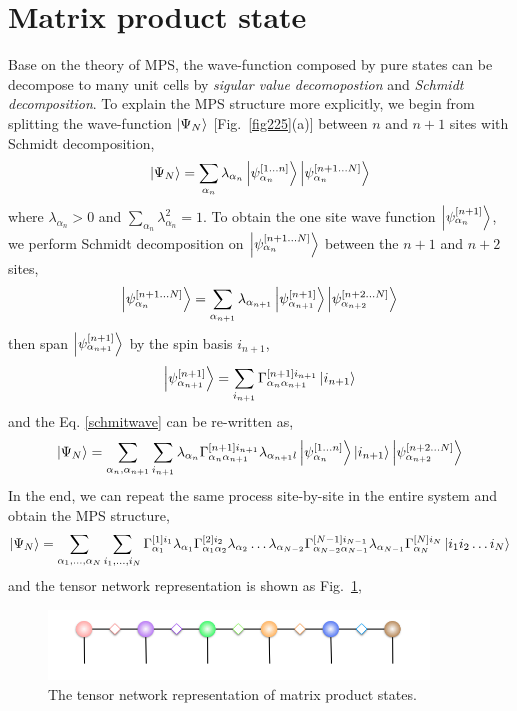 \section{Matrix product state}
\label{MPS}

Base on the theory of MPS, the wave-function composed by pure states can be decompose to many unit cells by \textit{sigular value decomopostion} and \textit{Schmidt decomposition}. To explain the MPS structure more explicitly, we begin from splitting the wave-function $\Ket{\Psi_N}$ [Fig.~\ref{fig225}(a)] between $n$ and $n+1$ sites with Schmidt decomposition, 
\begin{align}
	\label{schmitwave}
	\Ket{\Psi_{N}} = \sum_{\alpha_n} \lambda_{\alpha_n} \Ket{\psi_{\alpha_n}^{[1\dots n]}} \Ket{\psi_{\alpha_n}^{[n+1\dots N]}}
\end{align}
where $\lambda_{\alpha_n} > 0$ and $\sum\limits_{\alpha_n}{\lambda_{\alpha_n}^2 = 1}$. To obtain the one site wave function $\Ket{\psi_{\alpha_n}^{[n+1]}}$, we perform Schmidt decomposition on $\Ket{\psi_{\alpha_n}^{[n+1\dots N]}}$ between the $n+1$ and $n+2$ sites,
\begin{align}
	\Ket{\psi_{\alpha_n}^{[n+1\dots N]}} = \sum_{\alpha_{n+1}} \lambda_{\alpha_{n+1}} \Ket{\psi_{\alpha_{n+1}}^{[n+1]}} \Ket{\psi_{\alpha_{n+2}}^{[n+2\dots N]}}
\end{align}
then span $\Ket{\psi_{\alpha_{n+1}}^{[n+1]}}$ by the spin basis $i_{n+1}$,
\begin{align}
	\Ket{\psi_{\alpha_{n+1}}^{[n+1]}} = \sum_{i_{n+1}}{\Gamma^{[n+1] i_{n+1}}_{\alpha_n \alpha_{n+1}} \Ket{i_{n+1}}}
\end{align}
and the Eq. \ref{schmitwave} can be re-written as, 
\begin{align}
	\Ket{\Psi_{N}} = \sum_{\alpha_n,\alpha_{n+1}}\sum_{i_{n+1}}{\lambda_{\alpha_n} \Gamma^{[n+1] i_{n+1}}_{\alpha_n \alpha_{n+1}} \lambda_{\alpha_{n+1}l} \Ket{\psi_{\alpha_n}^{[1\dots n]}} \Ket{i_{n+1}} \Ket{\psi_{\alpha_{n+2}}^{[n+2\dots N]}} }
\end{align}
In the end, we can repeat the same process site-by-site in the entire system and obtain the MPS structure,
\begin{align}
	\Ket{\Psi_N} = \sum_{\alpha_1,\dots ,\alpha_N}\sum_{i_1,\dots ,i_N}{ \Gamma^{[1] i_{1}}_{\alpha_1} \lambda_{\alpha_1} \Gamma^{[2] i_{2}}_{\alpha_1 \alpha_{2}} \lambda_{\alpha_2} \dots  \lambda_{\alpha_{N-2}} \Gamma^{[N-1] i_{N-1}}_{\alpha_{N-2} \alpha_{N-1}} \lambda_{\alpha_{N-1}} \Gamma^{[N] i_{N}}_{\alpha_{N}} \Ket{i_1 i_2 \dots i_N}}
\end{align}
and the tensor network representation is shown as Fig.~\ref{fig311}, 
\begin{figure}[ht]
	\centering
	\includegraphics[width=0.90\textwidth]{figures/fig3111.png}
	\caption[The tensor network representation of matrix product states]{The tensor network representation of matrix product states.}
	\label{fig311}
\end{figure}

